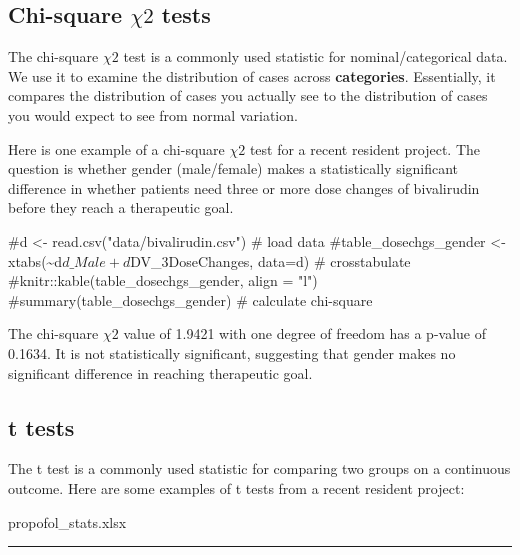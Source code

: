 \documentclass[
  letterpaper,
  DIV=11,
  numbers=noendperiod]{scrreprt}
\newenvironment{Shaded}{\begin{snugshade}}{\end{snugshade}}
\newcommand{\CommentTok}[1]{\textcolor[rgb]{0.37,0.37,0.37}{#1}}
\begin{document}
\hypertarget{chi-square-chi-2-tests}{%
\subsection*{\texorpdfstring{Chi-square \(\chi 2\)
tests}{Chi-square \textbackslash chi 2 tests}}\label{chi-square-chi-2-tests}}

The chi-square \(\chi 2\) test is a commonly used statistic for
nominal/categorical data. We use it to examine the distribution of cases
across \textbf{categories}. Essentially, it compares the distribution of
cases you actually see to the distribution of cases you would expect to
see from normal variation.

Here is one example of a chi-square \(\chi 2\) test for a recent
resident project. The question is whether gender (male/female) makes a
statistically significant difference in whether patients need three or
more dose changes of bivalirudin before they reach a therapeutic goal.

\begin{Shaded}
\begin{Highlighting}[]
\CommentTok{\#d \textless{}{-} read.csv("data/bivalirudin.csv") \# load data}
\CommentTok{\#table\_dosechgs\_gender \textless{}{-} xtabs(\textasciitilde{}d$d\_Male + d$DV\_3DoseChanges, data=d) \# crosstabulate }
\CommentTok{\#knitr::kable(table\_dosechgs\_gender, align = "l")}
\CommentTok{\#summary(table\_dosechgs\_gender) \# calculate chi{-}square}
\end{Highlighting}
\end{Shaded}

The chi-square \(\chi 2\) value of 1.9421 with one degree of freedom has
a p-value of 0.1634. It is not statistically significant, suggesting
that gender makes no significant difference in reaching therapeutic
goal.

\hypertarget{t-tests}{%
\subsection*{t tests}\label{t-tests}}

The t test is a commonly used statistic for comparing two groups on a
continuous outcome. Here are some examples of t tests from a recent
resident project:

propofol\_stats.xlsx

\begin{center}\rule{0.5\linewidth}{0.5pt}\end{center}
\end{document}

